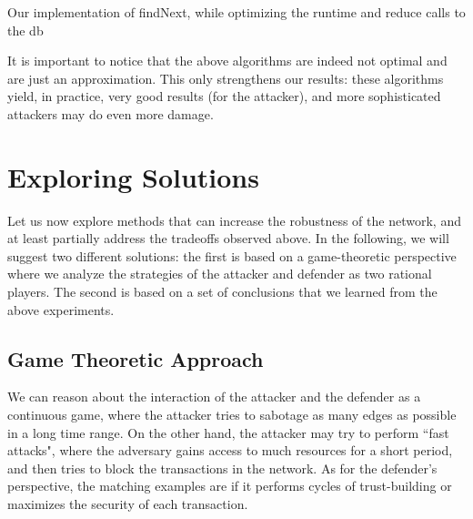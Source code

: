         \begin{algorithm}
        \DontPrintSemicolon
        
         \;
         
         \caption{Our implementation of findNext, while optimizing the runtime and reduce calls to the db}
         \label{alg::implementation}
    \end{algorithm}

    It is important to notice that the above algorithms are indeed not optimal and are just an approximation. This only strengthens our results: these algorithms yield, in practice, very good results (for the attacker), and more sophisticated attackers may do even more damage.
    
\section{Exploring Solutions} \label{sec::suggested_solution}

Let us now explore methods that can increase the robustness of the network,
and at least partially address the tradeoffs observed above.
In the following, we will suggest two different solutions:
the first is based on a game-theoretic perspective where 
we analyze the strategies of the attacker and defender as two rational players.
The second is based on a set of conclusions that we learned from the above experiments. 

\subsection{Game Theoretic Approach}

We can reason about the interaction of the attacker and the defender 
as a continuous game, where the attacker tries to sabotage 
as many edges as possible in a long time range. On the other hand, 
the attacker may try to perform ``fast attacks", where the adversary gains access to 
much resources for a short period, and then
tries to block the transactions in the network. As for the defender's perspective,
the matching examples are if 
it performs cycles of trust-building or maximizes the security of each transaction.

